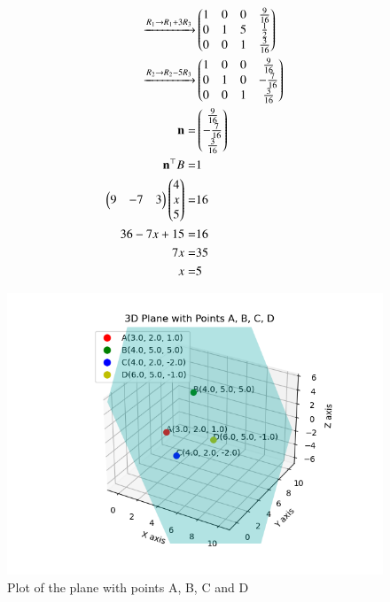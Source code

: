 \documentclass[journal]{IEEEtran}
\begin{document}
\begin{align}
    \xrightarrow{R_1 \to R_1+3R_3}&\begin{pmatrix}1 & 0 & 0 & \frac{9}{16} \\ 0 & 1 & 5 & \frac{1}{2} \\ 0 & 0 & 1 & \frac{3}{16}\end{pmatrix} \\
    \xrightarrow{R_2 \to R_2-5R_3}&\begin{pmatrix}1 & 0 & 0 & \frac{9}{16} \\ 0 & 1 & 0 & -\frac{7}{16} \\ 0 & 0 & 1 & \frac{3}{16}\end{pmatrix} \\
    \mathbf{n}=&\begin{pmatrix}\frac{9}{16} \\ -\frac{7}{16} \\ \frac{3}{16}\end{pmatrix} \\
    \mathbf{n}^{\top}B=&1 \\
    \begin{pmatrix}9 & -7 & 3\end{pmatrix}\begin{pmatrix}4 \\ x \\ 5\end{pmatrix}=&16 \\
    36-7x+15=&16 \\
    7x=&35 \\
    x=&5
\end{align}
\begin{figure}[ht!]
	\centering
   	\includegraphics[width=\linewidth]{figs/fig.png}
   	\caption{Plot of the plane with points A, B, C and D}
\label{Plot}
\end{figure}
\end{document}
